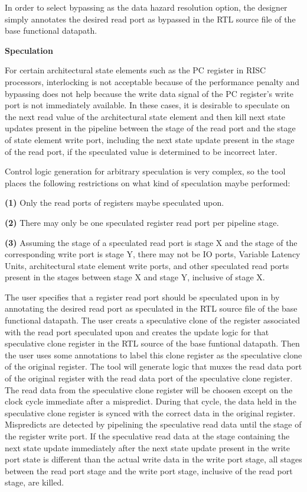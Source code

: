 In order to select bypassing as the data hazard resolution option, the designer simply annotates the desired read port as bypassed in the RTL source file of the base functional datapath.

{\bf Speculation}

For certain architectural state elements such as the PC register in RISC processors, interlocking is not acceptable because of the performance penalty and bypassing does not help because the write data signal of the PC register's write port is not immediately available. In these cases, it is desirable to speculate on the next read value of the architectural state element and then kill next state updates present in the pipeline between the stage of the read port and the stage of state element write port, including the next state update present in the stage of the read port, if the speculated value is determined to be incorrect later.

Control logic generation for arbitrary speculation is very complex, so the tool places the following restrictions on what kind of speculation maybe performed:

{\bf (1)} Only the read ports of registers maybe speculated upon.

{\bf (2)} There may only be one speculated register read port per pipeline stage.

{\bf (3)} Assuming the stage of a speculated read port is stage X and the stage of the corresponding write port is stage Y, there may not be IO ports, Variable Latency Units, architectural state element write ports, and other speculated read ports present in the stages between stage X and stage Y, inclusive of stage X.

The user specifies that a register read port should be speculated upon in by annotating the desired read port as speculated in the RTL source file of the base functional datapath. The user creats a speculative clone of the register associated with the read port speculated upon and creates the update logic for that speculative clone register in the RTL source of the base funtional datapath. Then the user uses some annotations to label this clone register as the speculative clone of the original register. The tool will generate logic that muxes the read data port of the original register with the read data port of the speculative clone register. The read data from the speculative clone register will be choosen except on the clock cycle immediate after a mispredict. During that cycle, the data held in the speculative clone register is synced with the correct data in the original register. Mispredicts are detected by pipelining the speculative read data until the stage of the register write port. If the speculative read data at the stage containing the next state update immediately after the next state update present in the write port state is different than the actual write data in the write port stage, all stages between the read port stage and the write port stage, inclusive of the read port stage, are killed.

